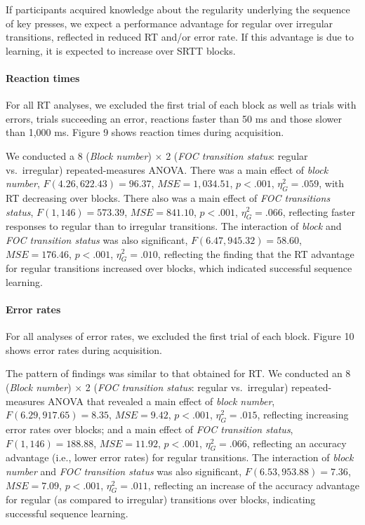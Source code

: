 \documentclass[floatsintext,man]{apa6}
\begin{document}
If participants acquired knowledge about the regularity underlying the
sequence of key presses, we expect a performance advantage for regular
over irregular transitions, reflected in reduced RT and/or error rate.
If this advantage is due to learning, it is expected to increase over
SRTT blocks.

\paragraph{Reaction times}\label{reaction-times-2}



For all RT analyses, we excluded the first trial of each block as well
as trials with errors, trials succeeding an error, reactions faster than
50 ms and those slower than 1,000 ms. Figure 9 shows reaction times
during acquisition.

We conducted a 8 (\emph{Block number}) \(\times\) 2 (\emph{FOC
transition status}: regular vs.~irregular) repeated-measures ANOVA.
There was a main effect of \emph{block number},
\(F(4.26, 622.43) = 96.37\), \(\mathit{MSE} = 1,034.51\), \(p < .001\),
\(\eta^2_G = .059\), with RT decreasing over blocks. There also was a
main effect of \emph{FOC transitions status}, \(F(1, 146) = 573.39\),
\(\mathit{MSE} = 841.10\), \(p < .001\), \(\eta^2_G = .066\), reflecting
faster responses to regular than to irregular transitions. The
interaction of \emph{block} and \emph{FOC transition status} was also
significant, \(F(6.47, 945.32) = 58.60\), \(\mathit{MSE} = 176.46\),
\(p < .001\), \(\eta^2_G = .010\), reflecting the finding that the RT
advantage for regular transitions increased over blocks, which indicated
successful sequence learning.

\paragraph{Error rates}\label{error-rates-2}



For all analyses of error rates, we excluded the first trial of each
block. Figure 10 shows error rates during acquisition.

The pattern of findings was similar to that obtained for RT. We
conducted an 8 (\emph{Block number}) \(\times\) 2 (\emph{FOC transition
status}: regular vs.~irregular) repeated-measures ANOVA that revealed a
main effect of \emph{block number}, \(F(6.29, 917.65) = 8.35\),
\(\mathit{MSE} = 9.42\), \(p < .001\), \(\eta^2_G = .015\), reflecting
increasing error rates over blocks; and a main effect of \emph{FOC
transition status}, \(F(1, 146) = 188.88\), \(\mathit{MSE} = 11.92\),
\(p < .001\), \(\eta^2_G = .066\), reflecting an accuracy advantage
(i.e., lower error rates) for regular transitions. The interaction of
\emph{block number} and \emph{FOC transition status} was also
significant, \(F(6.53, 953.88) = 7.36\), \(\mathit{MSE} = 7.09\),
\(p < .001\), \(\eta^2_G = .011\), reflecting an increase of the
accuracy advantage for regular (as compared to irregular) transitions
over blocks, indicating successful sequence learning.
\end{document}
